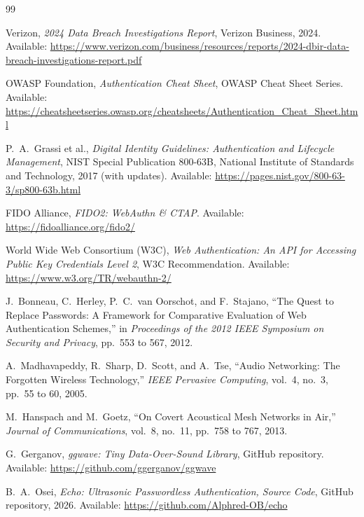\renewcommand{\bibname}{References}
\begingroup
\raggedright
\begin{thebibliography}{99}

Verizon, \emph{2024 Data Breach Investigations Report}, Verizon Business, 2024.
Available: \url{https://www.verizon.com/business/resources/reports/2024-dbir-data-breach-investigations-report.pdf}

OWASP Foundation, \emph{Authentication Cheat Sheet}, OWASP Cheat Sheet Series.
Available: \url{https://cheatsheetseries.owasp.org/cheatsheets/Authentication_Cheat_Sheet.html}

P.\ A.\ Grassi et al., \emph{Digital Identity Guidelines: Authentication and Lifecycle Management}, NIST Special Publication 800-63B, National Institute of Standards and Technology, 2017 (with updates).
Available: \url{https://pages.nist.gov/800-63-3/sp800-63b.html}

FIDO Alliance, \emph{FIDO2: WebAuthn \& CTAP}.
Available: \url{https://fidoalliance.org/fido2/}

World Wide Web Consortium (W3C), \emph{Web Authentication: An API for Accessing Public Key Credentials Level 2}, W3C Recommendation.
Available: \url{https://www.w3.org/TR/webauthn-2/}

J.\ Bonneau, C.\ Herley, P.\ C.\ van Oorschot, and F.\ Stajano, ``The Quest to Replace Passwords: A Framework for Comparative Evaluation of Web Authentication Schemes,'' in \emph{Proceedings of the 2012 IEEE Symposium on Security and Privacy}, pp.\ 553 to 567, 2012.

A.\ Madhavapeddy, R.\ Sharp, D.\ Scott, and A.\ Tse, ``Audio Networking: The Forgotten Wireless Technology,'' \emph{IEEE Pervasive Computing}, vol.\ 4, no.\ 3, pp.\ 55 to 60, 2005.

M.\ Hanspach and M.\ Goetz, ``On Covert Acoustical Mesh Networks in Air,'' \emph{Journal of Communications}, vol.\ 8, no.\ 11, pp.\ 758 to 767, 2013.

G.\ Gerganov, \emph{ggwave: Tiny Data-Over-Sound Library}, GitHub repository.
Available: \url{https://github.com/ggerganov/ggwave}

B.\ A.\ Osei, \emph{Echo: Ultrasonic Passwordless Authentication, Source Code}, GitHub repository, 2026.
Available: \url{https://github.com/Alphred-OB/echo}

\end{thebibliography}
\endgroup

